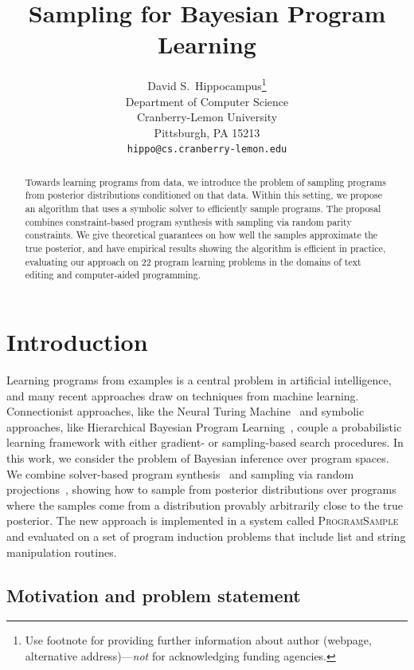 \documentclass{article}
\title{Sampling for Bayesian Program Learning}
\author{
  David S.~Hippocampus\thanks{Use footnote for providing further
    information about author (webpage, alternative
    address)---\emph{not} for acknowledging funding agencies.} \\
  Department of Computer Science\\
  Cranberry-Lemon University\\
  Pittsburgh, PA 15213 \\
  \texttt{hippo@cs.cranberry-lemon.edu} \\
}
\newcommand{\theSystem}{\textsc{ProgramSample}}
\begin{document}

\maketitle

\begin{abstract}
  Towards learning programs from data, we introduce the problem of
  sampling programs from posterior distributions conditioned on that
  data. Within this setting, we propose an algorithm that uses a
  symbolic solver to efficiently sample programs.  The proposal
  combines constraint-based program synthesis with sampling via random
  parity constraints.  We give theoretical guarantees on how well the
  samples approximate the true posterior, and have empirical results
  showing the algorithm is efficient in practice, evaluating our
  approach on 22 program learning problems in the domains of text
  editing and computer-aided programming.
\end{abstract}

\section{Introduction}
\label{introduction}
Learning programs from examples is a central problem in artificial intelligence, and many recent approaches draw on techniques from machine learning.
Connectionist approaches, like the Neural Turing Machine~\cite{graves2014neural,DBLP:journals/corr/ReedF15,vinyals2015pointer} and symbolic approaches, like Hierarchical Bayesian Program Learning~\cite{lake2015human,DBLP:conf/icml/LiangJK10,menon2013machine},
couple a probabilistic learning framework with either gradient- or sampling-based search procedures.
In this work,
we consider the problem of Bayesian inference over program spaces.
We combine solver-based program synthesis~\cite{solar2008program} and sampling via random projections~\cite{ermon2013embed},
showing how to sample from posterior distributions over programs where the samples come from a distribution provably arbitrarily close to the true posterior. The new approach is implemented in a system called \theSystem{}
and evaluated on a set of program induction problems that include list 
and string manipulation routines. 


\subsection{Motivation and problem statement}
\newlength{\mylength}
\setlength{\mylength}{0.25cm}   %
\end{document}
